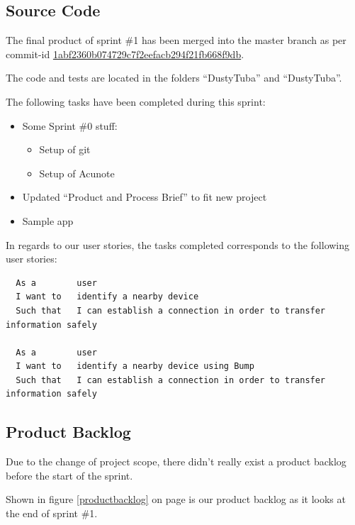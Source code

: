 \documentclass[a4paper,11pt]{article}
\begin{document}

\subsection{Source Code}

The final product of sprint \#1 has been merged into the master branch as per commit-id  \href{https://github.com/omegahm/DBP2P/commit/1abf2360b074729c7f2eefacb294f21fb668f9db}{1abf2360b074729c7f2eefacb294f21fb668f9db}.

The code and tests are located in the folders ``DustyTuba'' and ``DustyTuba''.

The following tasks have been completed during this sprint:
\begin{itemize}
	\item Some Sprint \#0 stuff:
	\begin{itemize}
		\item Setup of git
		\item Setup of Acunote
	\end{itemize}
	\item Updated ``Product and Process Brief'' to fit new project
	\item Sample app
\end{itemize}

In regards to our user stories, the tasks completed corresponds to the following user stories:
\begin{verbatim}
  As a        user
  I want to   identify a nearby device
  Such that   I can establish a connection in order to transfer information safely	

  As a        user
  I want to   identify a nearby device using Bump
  Such that   I can establish a connection in order to transfer information safely
\end{verbatim}

\subsection{Product Backlog}
Due to the change of project scope, there didn't really exist a product backlog before the start of the sprint.

Shown in figure \ref{productbacklog} on page \pageref{productbacklog} is our product backlog as it looks at the end of sprint \#1.
\end{document}
